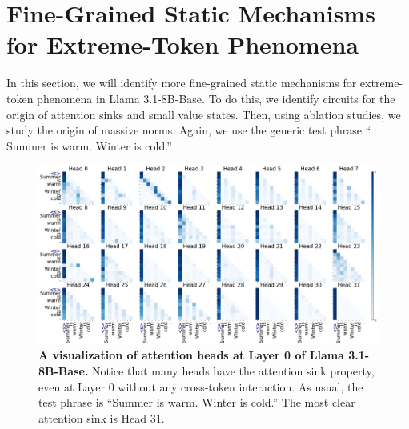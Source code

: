 \section{Fine-Grained Static Mechanisms for Extreme-Token Phenomena} \label{sec:circuit}

In this section, we will identify more fine-grained static mechanisms for extreme-token phenomena in Llama 3.1-8B-Base. To do this, we identify circuits for the origin of attention sinks and small value states. Then, using ablation studies, we study the origin of massive norms. Again, we use the generic test phrase ``\bos{} Summer is warm. Winter is cold.''

\begin{figure}[h]
    \centering
    \includegraphics[width=\textwidth]{Figures/llama_31_circuit/llama_31_attn_l0.png}
    \caption{\small \textbf{A visualization of attention heads at Layer 0 of Llama 3.1-8B-Base.} Notice that many heads have the attention sink property, even at Layer 0 without any cross-token interaction. As usual, the test phrase is ``Summer is warm. Winter is cold.'' The most clear attention sink is Head 31.}
    \label{fig:llama_31_attn_layer0}
\end{figure}

